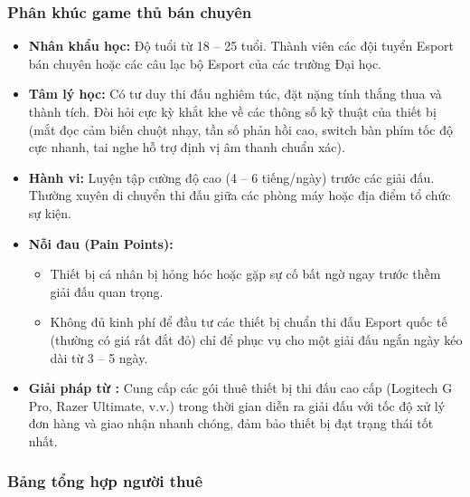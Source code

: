 \subsubsection{Phân khúc game thủ bán chuyên}
\begin{itemize}
    \item \textbf{Nhân khẩu học:} Độ tuổi từ 18 -- 25 tuổi. Thành viên các đội tuyển Esport bán chuyên hoặc các câu lạc bộ Esport của các trường Đại học.
    \item \textbf{Tâm lý học:} Có tư duy thi đấu nghiêm túc, đặt nặng tính thắng thua và thành tích. Đòi hỏi cực kỳ khắt khe về các thông số kỹ thuật của thiết bị (mắt đọc cảm biến chuột nhạy, tần số phản hồi cao, switch bàn phím tốc độ cực nhanh, tai nghe hỗ trợ định vị âm thanh chuẩn xác).
    \item \textbf{Hành vi:} Luyện tập cường độ cao (4 -- 6 tiếng/ngày) trước các giải đấu. Thường xuyên di chuyển thi đấu giữa các phòng máy hoặc địa điểm tổ chức sự kiện.
    \item \textbf{Nỗi đau (Pain Points):}
    \begin{itemize}
        \item Thiết bị cá nhân bị hỏng hóc hoặc gặp sự cố bất ngờ ngay trước thềm giải đấu quan trọng.
        \item Không đủ kinh phí để đầu tư các thiết bị chuẩn thi đấu Esport quốc tế (thường có giá rất đắt đỏ) chỉ để phục vụ cho một giải đấu ngắn ngày kéo dài từ 3 -- 5 ngày.
    \end{itemize}
    \item \textbf{Giải pháp từ \projectname{}:} Cung cấp các gói thuê thiết bị thi đấu cao cấp (Logitech G Pro, Razer Ultimate, v.v.) trong thời gian diễn ra giải đấu với tốc độ xử lý đơn hàng và giao nhận nhanh chóng, đảm bảo thiết bị đạt trạng thái tốt nhất.
\end{itemize}

\subsubsection{Bảng tổng hợp người thuê}

